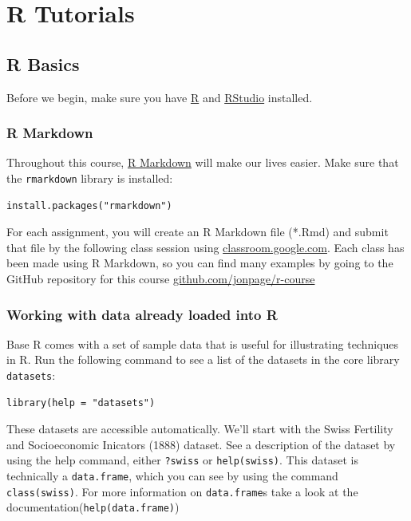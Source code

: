 \documentclass[]{book}
\theoremstyle{definition}
\theoremstyle{definition}
\theoremstyle{remark}
\begin{document}
\part{R Tutorials}\label{part-r-tutorials}

\hypertarget{intro}{\chapter{R Basics}\label{intro}}

Before we begin, make sure you have
\href{https://cran.r-project.org/}{R} and
\href{https://www.rstudio.com/products/rstudio/download3/\#download}{RStudio}
installed.

\section{R Markdown}\label{r-markdown}

Throughout this course,
\href{http://rmarkdown.rstudio.com/lesson-1.html}{R Markdown} will make
our lives easier. Make sure that the \texttt{rmarkdown} library is
installed:

\begin{verbatim}
install.packages("rmarkdown")
\end{verbatim}

For each assignment, you will create an R Markdown file (*.Rmd) and
submit that file by the following class session using
\href{https://classroom.google.com}{classroom.google.com}. Each class
has been made using R Markdown, so you can find many examples by going
to the GitHub repository for this course
\href{https://github.com/jonpage/r-course}{github.com/jonpage/r-course}

\section{Working with data already loaded into
R}\label{working-with-data-already-loaded-into-r}

Base R comes with a set of sample data that is useful for illustrating
techniques in R. Run the following command to see a list of the datasets
in the core library \texttt{datasets}:

\begin{verbatim}
library(help = "datasets")
\end{verbatim}

These datasets are accessible automatically. We'll start with the Swiss
Fertility and Socioeconomic Inicators (1888) dataset. See a description
of the dataset by using the help command, either \texttt{?swiss} or
\texttt{help(swiss)}. This dataset is technically a \texttt{data.frame},
which you can see by using the command \texttt{class(swiss)}. For more
information on \texttt{data.frame}s take a look at the
documentation(\texttt{help(data.frame)})
\end{document}
